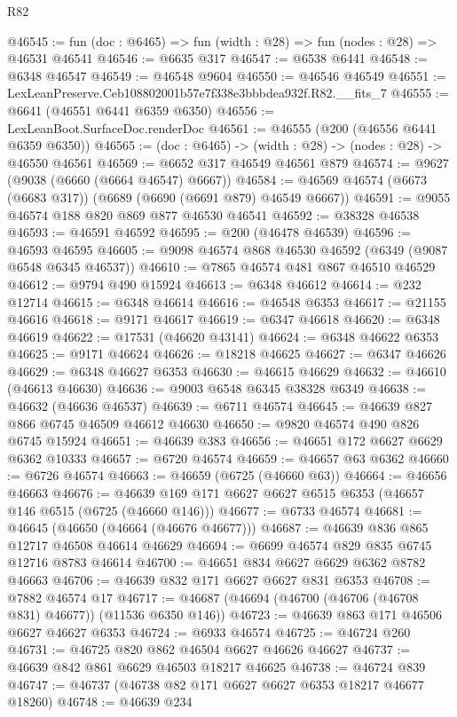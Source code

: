 \begin{lexlean}{R82}
\begin{coremodule}
@46545 := fun (doc : @6465) => fun (width : @28) => fun (nodes : @28) => @46531 @46541
@46546 := @6635 @317
@46547 := @6538 @6441
@46548 := @6348 @46547
@46549 := @46548 @9604
@46550 := @46546 @46549
@46551 := LexLeanPreserve.Ceb108802001b57e7f338e3bbbdea932f.R82.__fits_7
@46555 := @6641 (@46551 @6441 @6359 @6350)
@46556 := LexLeanBoot.SurfaceDoc.renderDoc
@46561 := @46555 (@200 (@46556 @6441 @6359 @6350))
@46565 := (doc : @6465) -> (width : @28) -> (nodes : @28) -> @46550 @46561
@46569 := @6652 @317 @46549 @46561 @879
@46574 := @9627 (@9038 (@6660 (@6664 @46547) @6667))
@46584 := @46569 @46574 (@6673 (@6683 @317)) (@6689 (@6690 (@6691 @879) @46549 @6667))
@46591 := @9055 @46574 @188 @820 @869 @877 @46530 @46541
@46592 := @38328 @46538
@46593 := @46591 @46592
@46595 := @200 (@46478 @46539)
@46596 := @46593 @46595
@46605 := @9098 @46574 @868 @46530 @46592 (@6349 (@9087 @6548 @6345 @46537))
@46610 := @7865 @46574 @481 @867 @46510 @46529
@46612 := @9794 @490 @15924
@46613 := @6348 @46612
@46614 := @232 @12714
@46615 := @6348 @46614
@46616 := @46548 @6353
@46617 := @21155 @46616
@46618 := @9171 @46617
@46619 := @6347 @46618
@46620 := @6348 @46619
@46622 := @17531 (@46620 @43141)
@46624 := @6348 @46622 @6353
@46625 := @9171 @46624
@46626 := @18218 @46625
@46627 := @6347 @46626
@46629 := @6348 @46627 @6353
@46630 := @46615 @46629
@46632 := @46610 (@46613 @46630)
@46636 := @9003 @6548 @6345 @38328 @6349
@46638 := @46632 (@46636 @46537)
@46639 := @6711 @46574
@46645 := @46639 @827 @866 @6745 @46509 @46612 @46630
@46650 := @9820 @46574 @490 @826 @6745 @15924
@46651 := @46639 @383
@46656 := @46651 @172 @6627 @6629 @6362 @10333
@46657 := @6720 @46574
@46659 := @46657 @63 @6362
@46660 := @6726 @46574
@46663 := @46659 (@6725 (@46660 @63))
@46664 := @46656 @46663
@46676 := @46639 @169 @171 @6627 @6627 @6515 @6353 (@46657 @146 @6515 (@6725 (@46660 @146)))
@46677 := @6733 @46574
@46681 := @46645 (@46650 (@46664 (@46676 @46677)))
@46687 := @46639 @836 @865 @12717 @46508 @46614 @46629
@46694 := @6699 @46574 @829 @835 @6745 @12716 @8783 @46614
@46700 := @46651 @834 @6627 @6629 @6362 @8782 @46663
@46706 := @46639 @832 @171 @6627 @6627 @831 @6353
@46708 := @7882 @46574 @17
@46717 := @46687 (@46694 (@46700 (@46706 (@46708 @831) @46677)) (@11536 @6350 @146))
@46723 := @46639 @863 @171 @46506 @6627 @46627 @6353
@46724 := @6933 @46574
@46725 := @46724 @260
@46731 := @46725 @820 @862 @46504 @6627 @46626 @46627
@46737 := @46639 @842 @861 @6629 @46503 @18217 @46625
@46738 := @46724 @839
@46747 := @46737 (@46738 @82 @171 @6627 @6627 @6353 @18217 @46677 @18260)
@46748 := @46639 @234

\end{coremodule}
\end{lexlean}
